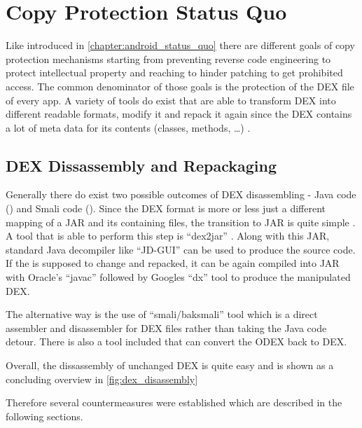\chapter{Copy Protection Status Quo}
\label{chapter:copy_protection_status_quo}

Like introduced in \autoref{chapter:android_status_quo} there
are different goals of copy protection mechanisms starting from
preventing reverse code engineering to protect intellectual property
and reaching to hinder patching to get prohibited access.
The common denominator of those goals is the protection of
the DEX file of every app. A variety of tools do exist that
are able to transform DEX into different readable formats,
modify it and repack it again since the DEX contains
a lot of meta data for its contents (classes, methods, \ldots)
\parencite{dex}.


\section{DEX Dissassembly and Repackaging}
Generally there do exist two possible outcomes of DEX disassembling
- Java code () and Smali code ().
Since the DEX format is more or less just a different mapping of a
JAR and its containing  files, the transition to JAR
is quite simple \parencite{dvminternals}. A tool that is able to
perform this step is ``dex2jar'' \parencite{dex2jartool}.
Along with this JAR, standard Java decompiler like ``JD-GUI''
\parencite{jdtool} can be used to produce the  source code.
If the  is supposed to change and repacked, it can
be again compiled into JAR with Oracle's ``javac'' \parencite{javactool}
followed by Googles ``dx'' tool \parencite{dxtool}
to produce the manipulated DEX.

The alternative way is the use of ``smali/baksmali'' tool
\parencite{smalitool} which is a direct assembler and disassembler
for DEX files rather than taking the Java code detour. There is also
a tool included that can convert the ODEX back to DEX.

Overall, the dissassembly of unchanged DEX is quite easy and is shown
as a concluding overview in \autoref{fig:dex_disassembly}

Therefore several countermeasures were established which are
described in the following sections.

